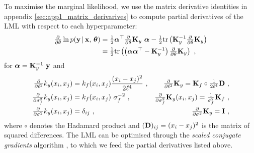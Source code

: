 	To maximise the marginal likelihood, we use the matrix derivative
	identities in appendix \ref{sec:app1_matrix_derivarives} to compute partial derivatives of the
	LML with respect to each hyperparameter:
	\begin{align*}
	    \tfrac{\partial}{\partial \theta} \ln p(\mathbf{y} \,|\, \mathbf{x},\, \boldsymbol{\theta})
	      &= \tfrac{1}{2} \boldsymbol{\alpha}^\top \tfrac{\partial}{\partial \theta} \mathbf{K}_y ~\boldsymbol{\alpha} - \tfrac{1}{2} \textrm{tr} \left( \mathbf{K}_y^{-1} \tfrac{\partial}{\partial \theta} \mathbf{K}_y \right) \\
	    &= \tfrac{1}{2} \textrm{tr} \left(  \left(\boldsymbol{\alpha} \boldsymbol{\alpha}^\top - \mathbf{K}_y^{-1}\right) \tfrac{\partial}{\partial \theta} \mathbf{K}_y  \right) ~,
	\end{align*}
	for $\boldsymbol{\alpha} = \mathbf{K}^{-1}_y ~ \mathbf{y}$ and
	\begin{align*} %
	    \pderiv{\ell^2} k_y(x_i, x_j) &=  k_f (x_i, x_j) \frac{(x_i - x_j)^2}{2\ell^4} ~,
	    &\pderiv{\ell^2} \mb{K}_y = \mb{K}_f \circ \tfrac{1}{2\ell^{4}} \mb{D} ~, \\
	    \pderiv{\sigma^2_f} k_y(x_i, x_j) &=  k_f (x_i, x_j) ~ \sigma^{-2}_f ~,
	    &\pderiv{\sigma^2_f} \mb{K}_y(x_i, x_j) =  \tfrac{1}{\sigma^2_f} \mb{K}_f ~, \\
	    \pderiv{\sigma^2} k_y(x_i, x_j) &=  \delta_{ij} ~,
	    &\pderiv{\sigma^2} \mb{K}_y =  \mb{I} ~,
	\end{align*}
	where $\circ$ denotes the Hadamard product and $(\mathbf{D})_{ij} = (x_i - x_j)^2$ is the matrix of squared differences.
	The LML can be optimised through the \textit{scaled conjugate gradients}
	algorithm \citep{moller1993scaled}, to which we feed the partial derivatives listed above.



